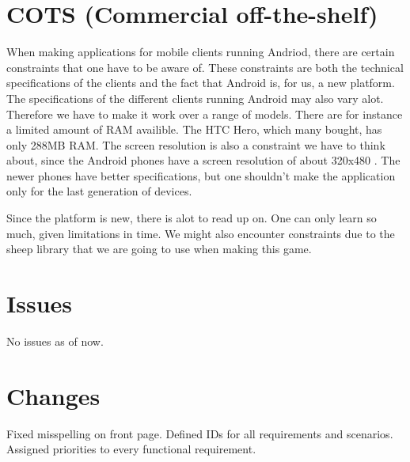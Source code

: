 \documentclass[11pt,a4paper]{article}
\begin{document}
\section{COTS (Commercial off-the-shelf)}
When making applications for mobile clients running Andriod, there are certain constraints that one have to be aware of. These constraints are both the technical specifications of the clients and the fact that Android is, for us, a new platform. The specifications of the different clients running Android may also vary alot. Therefore we have to make it work over a range of models. There are for instance a limited amount of RAM availible. The HTC Hero, which many bought, has only 288MB RAM. The screen resolution is also a constraint we have to think about, since the Android phones have a screen resolution of about 320x480 \cite{htchero}. The newer phones have better specifications, but one shouldn't make the application only for the last generation of devices.

Since the platform is new, there is alot to read up on. One can only learn so much, given limitations in time. We might also encounter constraints due to the sheep library that we are going to use when making this game.

\section{Issues}
No issues as of now.

\section{Changes}
Fixed misspelling on front page. Defined IDs for all requirements and scenarios. Assigned priorities to every functional requirement.



\end{document}
